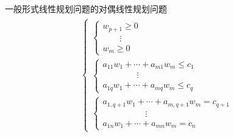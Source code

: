 \documentclass[lang = cn, scheme = chinese, thmcnt = section]{elegantbook}
\begin{document}
\begin{definition}{一般形式线性规划问题的对偶线性规划问题}
\begin{align*}
\begin{aligned}
\begin{cases}
\begin{cases}
					w_{p+1}\ge 0\\
					\qquad\vdots\\
					w_m\ge 0
				\end{cases} \\
				\begin{cases}
					a_{11} w_1 + \cdots + a_{m1} w_m \le c_1\\
					\qquad\qquad\vdots\\
					a_{1q} w_1 + \cdots + a_{mq} w_m \le c_q
				\end{cases} \\
				\begin{cases}
					a_{1,q+1} w_1 + \cdots + a_{m,q+1} w_m = c_{q+1}\\
					\quad\qquad\qquad\vdots\\
					a_{1n} w_1 + \cdots + a_{mn} w_m = c_n
				\end{cases}
			\end{cases}
		\end{aligned}
	\end{align*}
\end{definition}
\end{document}
